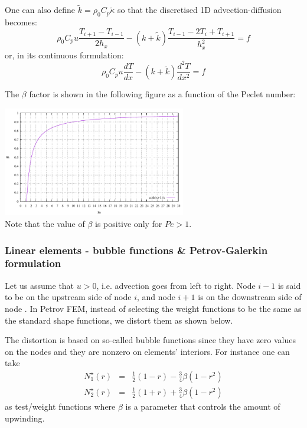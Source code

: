One can also define $\tilde{k}=\rho_0 C_p \tilde{\kappa}$ so that 
the discretised 1D advection-diffusion becomes:
\begin{equation}
\rho_0 C_p u \frac{T_{i+1}-T_{i-1}}{2h_x}
- (k+ \tilde{k}) \frac{T_{i-1}-2T_i+T_{i+1}}{h_x^2}
= f 
\end{equation}
or, in its continuous formulation:
\[
\rho_0 C_p u \frac{dT}{dx} - (k+ \tilde{k}) \frac{d^2T}{dx^2} = f
\]




The $\beta$ factor is shown in the following figure as a function of the Peclet number:
\begin{center}
\includegraphics[width=8cm]{images/supg/beta}\\
{\captionfont Note that the value of $\beta$ is positive only for $Pe>1$.}
\end{center}


\subsubsection{Linear elements - bubble functions \& Petrov-Galerkin formulation}

Let us assume that $u>0$, i.e. advection goes from left to right. 
Node $i-1$ is said to be on the upstream side of node $i$, and node $i+1$
is on the downstream side of node . In Petrov FEM, instead of selecting the weight functions to be the
same as the standard shape functions, we distort them as shown below.

The distortion is based on so-called bubble functions since they have zero
values on the nodes and they are nonzero on elements' interiors.
For instance one can take
\begin{eqnarray}
{N}^\star_1(r)&=&\frac{1}{2}(1-r)-\frac{3}{4}\beta(1-r^2) \\
{N}^\star_2(r)&=&\frac{1}{2}(1+r)+\frac{3}{4}\beta(1-r^2) 
\end{eqnarray}
as test/weight functions
where $\beta$ is a parameter that controls the amount of upwinding. 


